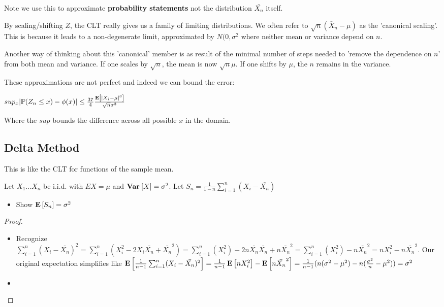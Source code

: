 \documentclass[10pt]{article}
\begin{document}
Note we use this to approximate \textbf{probability statements} not the
distribution $\bar{X_n}$ itself. 

\begin{note}
    By scaling/shifting $Z$, the CLT really gives us a family of limiting
    distributions. We often refer to $\sqrt{n}(\bar{X}_n - \mu)$ as the
    'canonical scaling'. This is because it leads to a non-degenerate limit,
    approximated by $N(0, \sigma^2$ where neither mean or variance depend on
    $n$.

    Another way of thinking about this 'canonical' member is as result of the
    minimal number of steps needed to 'remove the dependence on $n$' from both
    mean and variance. If one scales by $\sqrt{n}$, the mean is now
    $\sqrt{n}\mu$. If one shifts by $\mu$, the $n$ remains in the variance.
\end{note}

These approximations are not perfect and indeed we can bound the error:

\begin{definition}
    $sup_x |\mathbb{P}(Z_n \leq x) - \phi(x)| \leq \frac{37}{4}\frac{\operatorname{\mathbf{E}}\left[|X_i-\mu|^3\right]}{\sqrt{n}\sigma^3}$
\end{definition}

Where the $sup$ bounds the difference across all possible $x$ in the domain.

\subsection{Delta Method}

This is like the CLT for functions of the sample mean.

\begin{exercise}
    Let $X_1 \dots X_n$ be i.i.d. with $E{X} = \mu$ and $\operatorname{\mathbf{Var}}_{}\left[X\right] = \sigma^2$.
    Let $S_n = \frac{1}{1-n}\sum_{i=1}^n(X_i - \bar{X_n})$
    \begin{itemize}
        \item{Show $\operatorname{\mathbf{E}}\left[S_n\right] = \sigma^2$}
    \end{itemize}
\end{exercise}

\begin{proof}
    \begin{itemize}
        \item{Recognize $\sum_{i=1}^n (X_i - \bar{X_n})^2 = \sum_{i=1}^n (X_i^2
            - 2 X_i\bar{X_n} + \bar{X_n}^2) = \sum_{i=1}^n (X_i^2) - 2 n
        \bar{X_n} \bar{X_n} + n\bar{X_n}^2 = \sum_{i=1}^n (X_i^2) - n
    \bar{X_n}^2 = nX_i^2 - n\bar{X_n}^2$. Our original expectation simplifies
like $\operatorname{\mathbf{E}}\left[\frac{1}{n-1}\sum_{i=1}^n(X_i-\bar{X_n})^2\right] = \frac{1}{n-1}\operatorname{\mathbf{E}}\left[nX_i^2\right] -
\operatorname{\mathbf{E}}\left[n\bar{X_n}^2\right] = \frac{1}{n-1}(n(\sigma^2-\mu^2) - n(\frac{\sigma^2}{n} -
\mu^2)) = \sigma^2$}
        \item{}
    \end{itemize}
\end{proof}
\end{document}

